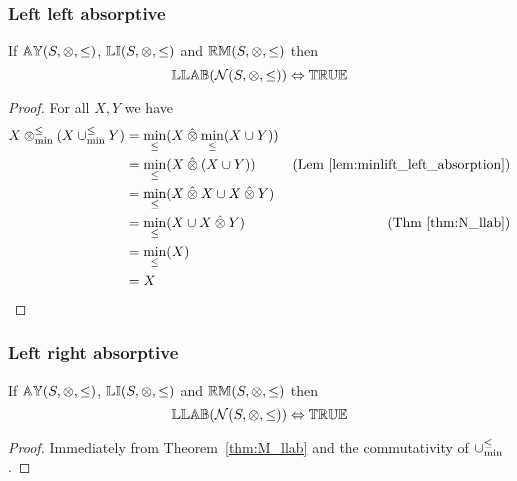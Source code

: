 \documentclass[../Summary.tex]{subfiles}
\begin{document}
\subsubsection{Left left absorptive}

\begin{theorem} \label{thm:M_llab}
If ${\mathbb{AY}}(S,\otimes,\leq)$, ${\mathbb{LI}}(S,\otimes,\leq)$ and ${\mathbb{RM}}(S,\otimes,\leq)$ then
\begin{equation*}
{\mathbb{LLAB}}(\mathcal{N}(S,\otimes,\leq)) \Leftrightarrow {\mathbb{TRUE}}
\end{equation*}
\end{theorem}


\begin{proof}

\vspace{0.5em}
For all $X, Y$ we have
\begin{align*}
X \mathbin{\otimes_{\min}^{\leq}} (X \mathbin{\cup_{\min}^{\leq}} Y) 	& = \min_\leq(X \mathbin{\hat{\otimes}} \min_\leq(X \cup Y) ) \\
							& = \min_\leq( X \mathbin{\hat{\otimes}} (X \cup Y)) & \text{(Lem \ref{lem:minlift_left_absorption})} \\
							& = \min_\leq(X \mathbin{\hat{\otimes}} X \cup X \mathbin{\hat{\otimes}} Y) \\
							& = \min_\leq(X \cup X \mathbin{\hat{\otimes}} Y) & \text{(Thm \ref{thm:N_llab})} \\
							& = \min_\leq(X) \\
							& = X
\end{align*}
\end{proof}




\subsubsection{Left right absorptive}

\begin{theorem} \label{thm:M_lrab}
If ${\mathbb{AY}}(S,\otimes,\leq)$, ${\mathbb{LI}}(S,\otimes,\leq)$ and ${\mathbb{RM}}(S,\otimes,\leq)$ then
\begin{equation*}
{\mathbb{LLAB}}(\mathcal{N}(S,\otimes,\leq)) \Leftrightarrow {\mathbb{TRUE}}
\end{equation*}
\end{theorem}


\begin{proof}

\vspace{0.5em}
Immediately from Theorem~\ref{thm:M_llab} and the commutativity of $\mathbin{\cup_{\min}^{\leq}}$.
\end{proof}
\end{document}
